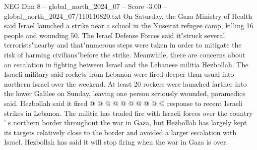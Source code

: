 \begin{textsample}{NEG Dim 8 – global\_north\_2024\_07 – Score -3.00 – global\_north\_2024\_07/110110820.txt}
On Saturday, the Gaza Ministry of Health said Israel launched a strike near a school in the Nuseirat refugee camp, killing 16 people and wounding 50.
The Israel Defense Forces said it"struck several terrorists"nearby and that"numerous steps were taken in order to mitigate the risk of harming civilians"before the strike.
Meanwhile, there are concerns about an escalation in fighting between Israel and the Lebanese militia Hezbollah.
The Israeli military said rockets from Lebanon were fired deeper than usual into northern Israel over the weekend.
At least 20 rockers were launched farther into the lower Galilee on Sunday, leaving one person seriously wounded, paramedics said.
Hezbollah said it fired @ @ @ @ @ @ @ @ @ @ response to recent Israeli strikes in Lebanon.
The militia has traded fire with Israeli forces over the country ' s northern border throughout the war in Gaza, but Hezbollah has largely kept its targets relatively close to the border and avoided a larger escalation with Israel.
Hezbollah has said it will stop firing when the war in Gaza is over.

\end{textsample}
